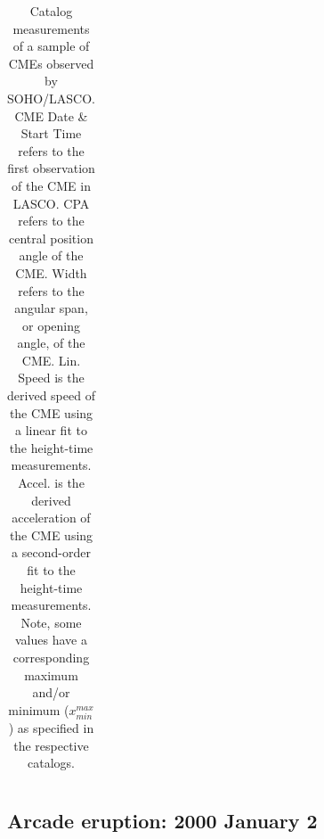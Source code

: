 \documentclass[referee,a4paper,12pt,traditabstract]{swsc}
\begin{document}
\begin{linenumbers}
\begin{table}[!t]
\begin{tabular}{l*{5}{c}r}
\end{tabular}
\caption{Catalog measurements of a sample of CMEs observed by SOHO/LASCO. CME Date \& Start Time refers to the first observation of the CME in LASCO. CPA refers to the central position angle of the CME. Width refers to the angular span, or opening angle, of the CME. Lin. Speed is the derived speed of the CME using a linear fit to the height-time measurements. Accel. is the derived acceleration of the CME using a second-order fit to the height-time measurements. Note, some values have a corresponding maximum and/or minimum ($x_{min}^{max}$) as specified in the respective catalogs.}
\label{event_table}
\end{table}


\subsection{Arcade eruption: 2000 January 2}
\label{sect_20000102}


\end{linenumbers}
\end{document}
